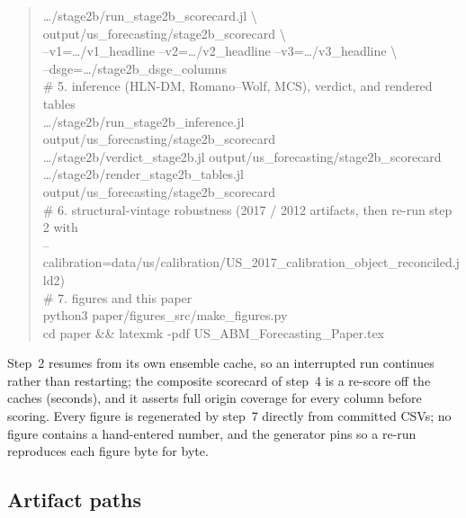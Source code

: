 \documentclass[11pt,a4paper]{article}
\newcommand{\code}[1]{\texttt{\detokenize{#1}}}
\begin{document}
\begin{quote}
\hspace*{2em}\ldots{}/stage2b/run\_stage2b\_scorecard.jl \textbackslash\\
\hspace*{2em}output/us\_forecasting/stage2b\_scorecard \textbackslash\\
\hspace*{2em}--v1=\ldots{}/v1\_headline --v2=\ldots{}/v2\_headline --v3=\ldots{}/v3\_headline \textbackslash\\
\hspace*{2em}--dsge=\ldots{}/stage2b\_dsge\_columns\\[4pt]
\# 5. inference (HLN-DM, Romano--Wolf, MCS), verdict, and rendered tables\\
\hspace*{2em}\ldots{}/stage2b/run\_stage2b\_inference.jl output/us\_forecasting/stage2b\_scorecard\\
\hspace*{2em}\ldots{}/stage2b/verdict\_stage2b.jl output/us\_forecasting/stage2b\_scorecard\\
\hspace*{2em}\ldots{}/stage2b/render\_stage2b\_tables.jl output/us\_forecasting/stage2b\_scorecard\\[4pt]
\# 6. structural-vintage robustness (2017 / 2012 artifacts, then re-run step 2 with\\
\hspace*{2em}--calibration=data/us/calibration/US\_2017\_calibration\_object\_reconciled.jld2)\\[4pt]
\# 7. figures and this paper\\
python3 paper/figures\_src/make\_figures.py\\
cd paper \&\& latexmk -pdf US\_ABM\_Forecasting\_Paper.tex
\end{quote}

Step~2 resumes from its own ensemble cache, so an interrupted run continues rather than
restarting; the composite scorecard of step~4 is a re-score off the caches (seconds), and it
asserts full origin coverage for every column before scoring. Every figure is regenerated by
step~7 directly from committed CSVs; no figure contains a hand-entered number, and the generator
pins \code{SOURCE_DATE_EPOCH} so a re-run reproduces each figure byte for byte.

\subsection{Artifact paths}
\label{app:artifacts}
\end{document}
